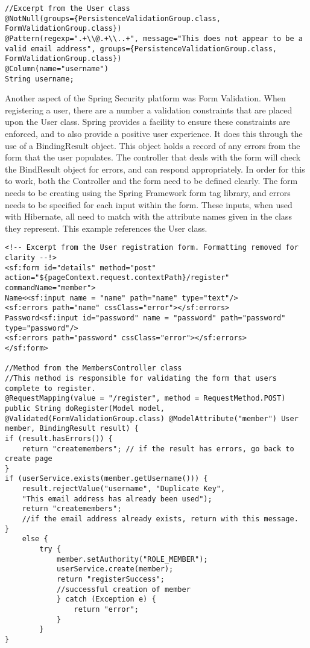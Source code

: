 \begin{lstlisting}
//Excerpt from the User class
@NotNull(groups={PersistenceValidationGroup.class, FormValidationGroup.class})
@Pattern(regexp=".+\\@.+\\..+", message="This does not appear to be a valid email address", groups={PersistenceValidationGroup.class, FormValidationGroup.class})
@Column(name="username")
String username;
\end{lstlisting}

Another aspect of the Spring Security platform was Form Validation. When registering a user, there are a number a validation constraints that are placed upon the User class. Spring provides a facility to ensure these constraints are enforced, and to also provide a positive user experience. It does this through the use of a BindingResult object. This object holds a record of any errors from the form that the user populates. The controller that deals with the form will check the BindResult object for errors, and can respond appropriately. In order for this to work, both the Controller and the form need to be defined clearly. The form needs to be creating using the Spring Framework form tag library, and errors needs to be specified for each input within the form. These inputs, when used with Hibernate, all need to match with the attribute names given in the class they represent. This example references the User class. \pagebreak

\begin{lstlisting}
<!-- Excerpt from the User registration form. Formatting removed for clarity --!>
<sf:form id="details" method="post" action="${pageContext.request.contextPath}/register" commandName="member">
Name<<sf:input name = "name" path="name" type="text"/>
<sf:errors path="name" cssClass="error"></sf:errors>
Password<sf:input id="password" name = "password" path="password" type="password"/>
<sf:errors path="password" cssClass="error"></sf:errors>
</sf:form>

//Method from the MembersController class
//This method is responsible for validating the form that users complete to register.
@RequestMapping(value = "/register", method = RequestMethod.POST)
public String doRegister(Model model,
@Validated(FormValidationGroup.class) @ModelAttribute("member") User member, BindingResult result) {
if (result.hasErrors()) {
	return "createmembers"; // if the result has errors, go back to create page
}
if (userService.exists(member.getUsername())) {
	result.rejectValue("username", "Duplicate Key",
	"This email address has already been used");
	return "createmembers";
	//if the email address already exists, return with this message.
}
	else {
		try {
			member.setAuthority("ROLE_MEMBER");
			userService.create(member);
			return "registerSuccess";
			//successful creation of member
			} catch (Exception e) {
				return "error";
			}
		}
}
\end{lstlisting}

